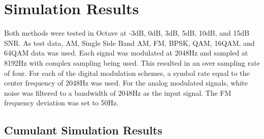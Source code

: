 \section{Simulation Results}

Both methods were tested in Octave at -3dB, 0dB, 3dB, 5dB, 10dB, and 15dB SNR. 
As test data, AM, Single Side Band AM, FM, BPSK, QAM, 16QAM, and 64QAM data was
used.  Each signal was modulated at 2048Hz and sampled at 8192Hz with complex
sampling being used.  This resulted in an over sampling rate of four.  For each
of the digital modulation schemes, a symbol rate equal to the center frequency
of 2048Hz was used.  For the analog modulated signals, white noise was filtered
to a bandwidth of 2048Hz as the input signal.  The FM frequency deviation was
set to 50Hz.

\subsection{Cumulant Simulation Results}

